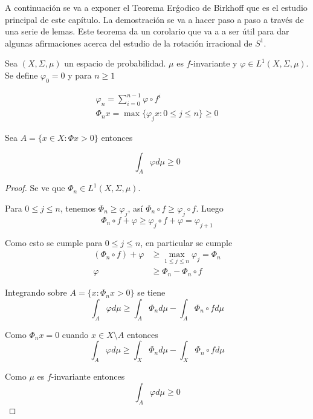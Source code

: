 A continuación se va a exponer el Teorema Erǵodico de Birkhoff que es el estudio principal de este capítulo. La demostración se va a hacer paso a paso a través de una serie de lemas. Este teorema da un corolario que va a a ser útil para dar algunas afirmaciones acerca del estudio de la rotación irracional de $S^1$.

\begin{lema}\label{maxima_desigualdad}
	Sea $(X,\Sigma,\mu)$ un espacio de probabilidad. $\mu$ es $f$-invariante y $\varphi \in L^1(X,\Sigma,\mu)$. Se define $\varphi_0 = 0$ y para $n \geq 1$
	
	\begin{gather}
		\varphi_n = \sum_{i=0}^{n-1} \varphi \circ f^i\\
		\varPhi_n x = \max \{\varphi_j x : 0 \leq j \leq n\} \geq 0
	\end{gather}
	
	Sea $A = \{x \in X: \varPhi x > 0 \}$ entonces

	\begin{equation}
		\int_A \varphi d\mu \geq 0
	\end{equation}
\end{lema}

\begin{proof}
	Se ve que $\varPhi_n \in L^1(X,\Sigma,\mu)$. 
	
	Para $0 \leq j \leq n$, tenemos $\varPhi_n \geq \varphi_j$, así $\varPhi_n \circ f \geq \varphi_j \circ f$. Luego
	\begin{equation}
		\varPhi_n \circ f + \varphi \geq \varphi_j \circ f + \varphi = \varphi_{j+1}
	\end{equation}
	
	Como esto se cumple para $0 \leq j \leq n$, en particular se cumple
	\begin{align}
		(\varPhi_n \circ f)  + \varphi  &\geq \max_{1 \leq j \leq n} \varphi_j  = \varPhi_n\\
		\varphi &\geq \varPhi_n - \varPhi_n \circ f 
	\end{align}
	
	Integrando sobre $A= \{x: \varPhi_n x > 0\}$ se tiene
	\begin{equation}
		\int_A \varphi d\mu \geq \int_A \varPhi_n d\mu - \int_A \varPhi_n \circ f d\mu
	\end{equation}
	
	Como $\varPhi_n x = 0$ cuando $x \in X \setminus A$ entonces
	\begin{equation}
		\int_A \varphi d\mu \geq \int_X \varPhi_n d\mu - \int_X \varPhi_n \circ f d\mu
	\end{equation}
	
	Como $\mu$ es $f$-invariante entonces
	\begin{equation}
		\int_A \varphi d\mu \geq 0
	\end{equation}
\end{proof}

